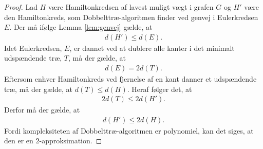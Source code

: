 \begin{proof}
Lad $H$ være Hamiltonkredsen af lavest muligt vægt i grafen $G$ og $H'$ være den Hamiltonkreds, som Dobbelttræ-algoritmen finder ved genvej i Eulerkredsen $E$. Der må ifølge Lemma \ref{lem:genvej} gælde, at 
\begin{align*}
	d(H')\leq d(E).
\end{align*}
Idet Eulerkredsen, $E$, er dannet ved at dublere alle kanter i det minimalt udspændende træ, $T$, må der gælde, at 
\begin{align*}
	d(E) = 2d(T).
\end{align*}
Eftersom enhver Hamiltonkreds ved fjernelse af en kant danner et udspændende træ, må der gælde, at $d(T) \leq d(H)$.
	Heraf følger det, at
	\begin{align*}
		2d(T) \leq 2d(H').
	\end{align*}
Derfor må der gælde, at 
	\begin{align*}
		d(H') \leq 2d(H).
	\end{align*}
	Fordi kompleksiteten af Dobbelttræ-algoritmen er polynomiel, kan det siges, at den er en $2$-approksimation. 
\end{proof}
